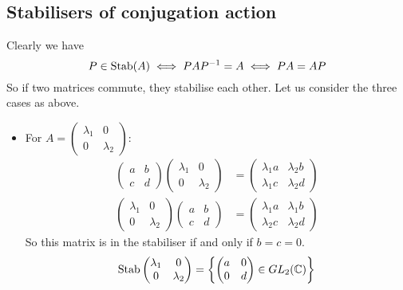 \subsection{Stabilisers of conjugation action}
Clearly we have
\[
	P \in \operatorname{Stab}(A) \iff PAP^{-1} = A \iff PA = AP
\]
So if two matrices commute, they stabilise each other.
Let us consider the three cases as above.
\begin{itemize}
	\item For \(A = \begin{pmatrix}
		      \lambda_1 & 0 \\ 0 & \lambda_2
	      \end{pmatrix}\):
	      \begin{align*}
		      \begin{pmatrix}
			      a & b \\ c & d
		      \end{pmatrix}\begin{pmatrix}
			      \lambda_1 & 0 \\ 0 & \lambda_2
		      \end{pmatrix} & = \begin{pmatrix}
			      \lambda_1 a & \lambda_2 b \\
			      \lambda_1 c & \lambda_2 d
		      \end{pmatrix} \\
		      \begin{pmatrix}
			      \lambda_1 & 0 \\ 0 & \lambda_2
		      \end{pmatrix}\begin{pmatrix}
			      a & b \\ c & d
		      \end{pmatrix} & = \begin{pmatrix}
			      \lambda_1 a & \lambda_1 b \\
			      \lambda_2 c & \lambda_2 d
		      \end{pmatrix}
	      \end{align*}
	      So this matrix is in the stabiliser if and only if \(b = c = 0\).
	      \[
		      \operatorname{Stab}\begin{pmatrix}
			      \lambda_1 & 0 \\ 0 & \lambda_2
		      \end{pmatrix} = \left\{ \begin{pmatrix}
			      a & 0 \\ 0 & d
		      \end{pmatrix} \in GL_2(\mathbb C) \right\}
\]
\end{itemize}
